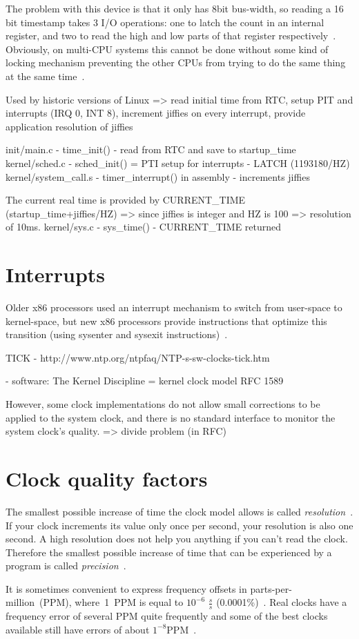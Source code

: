 The problem with this device is that it only has
8bit bus-width, so reading a 16 bit timestamp takes
3 I/O operations: one to latch the count in an internal register,
and two to read the high and low parts
of that register respectively~\cite{timecounters}.
Obviously, on multi-CPU systems this cannot be
done without some kind of locking mechanism
preventing the other CPUs from trying to do the
same thing at the same time~\cite{timecounters}.


Used by historic versions of Linux
=> read initial time from RTC, setup PIT and interrupts (IRQ 0, INT 8), increment jiffies on every interrupt, provide application resolution of jiffies

init/main.c - time\_init() - read from RTC and save to startup\_time
kernel/sched.c - sched\_init() = PTI setup for interrupts - LATCH (1193180/HZ)
kernel/system\_call.s - timer\_interrupt() in assembly - increments jiffies

The current real time is provided by CURRENT\_TIME (startup\_time+jiffies/HZ) => since jiffies is integer and HZ is 100 => resolution of 10ms.
kernel/sys.c - sys\_time() - CURRENT\_TIME returned

\section{Interrupts}
Older x86 processors used an interrupt mechanism to switch from
user-space to kernel-space, but new x86 processors provide instructions
that optimize this transition (using sysenter and sysexit instructions)~\cite{ibm-linux-system-calls}.


TICK - http://www.ntp.org/ntpfaq/NTP-s-sw-clocks-tick.htm


- software:
The Kernel Discipline =  kernel clock model RFC 1589

However, some clock implementations do not allow small corrections to be applied to the system clock, and there is no standard interface to monitor the system clock's quality.
=> divide problem (in RFC)

\section{Clock quality factors}
The smallest possible increase of time the clock model allows is called {\it{resolution}}~\cite{ntp-faq}.
If your clock increments its value only once per second, your resolution is also one second.
A high resolution does not help you anything if you can't read the clock.
Therefore the smallest possible increase of time that can be experienced
by a program is called {\it{precision}}~\cite{ntp-faq}.

It is sometimes convenient
to express frequency offsets in parts-per-million~(PPM), where~1~PPM
is equal to $10^{-6}$ $\frac{s}{s}$ (0.0001\%)~\cite{rfc5905}.
Real clocks have a frequency error of several PPM quite frequently
and some of the best clocks available still have errors of about $1^{-8}$PPM~\cite{ntp-faq}.
